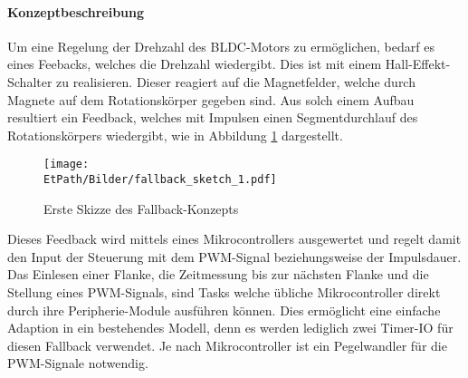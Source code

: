 \paragraph{Konzeptbeschreibung}$~~$\vspace{2mm}\\
\fi
Um eine Regelung der Drehzahl des BLDC-Motors zu ermöglichen, bedarf es eines
Feebacks, welches die Drehzahl wiedergibt. Dies ist mit einem
Hall-Effekt-Schalter zu realisieren. Dieser reagiert auf die Magnetfelder,
welche durch Magnete auf dem Rotationskörper gegeben sind. Aus solch einem
Aufbau resultiert ein Feedback, welches mit Impulsen einen Segmentdurchlauf
des Rotationskörpers wiedergibt, wie in Abbildung \ref{fig:fallback-sketch}
dargestellt.
\begin{figure}[h!]
	\centering
	\texttt{[image: \\EtPath/Bilder/fallback\_sketch\_1.pdf]}
	\caption{Erste Skizze des Fallback-Konzepts}
	\label{fig:fallback-sketch}
\end{figure}
Dieses Feedback wird mittels eines Mikrocontrollers ausgewertet und regelt
damit den Input der Steuerung mit dem PWM-Signal beziehungsweise der Impulsdauer.
Das Einlesen einer Flanke, die Zeitmessung bis zur nächsten Flanke und die
Stellung eines PWM-Signals, sind Tasks welche übliche Mikrocontroller direkt
durch ihre Peripherie-Module ausführen können. Dies ermöglicht eine einfache
Adaption in ein bestehendes Modell, denn es werden lediglich zwei Timer-IO
für diesen Fallback verwendet. Je nach Mikrocontroller ist ein Pegelwandler
für die PWM-Signale notwendig.
